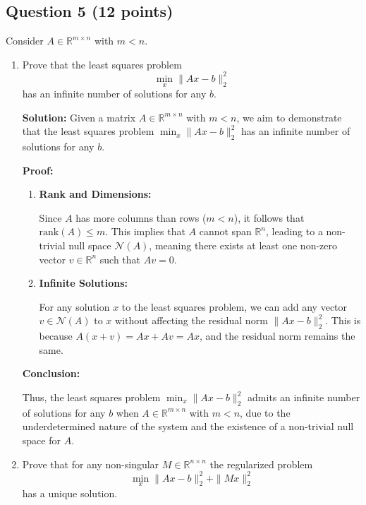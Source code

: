 \documentclass[11pt,onecolumn]{article}
\newcommand{\R}{\mathbb{R}}
\newcommand{\Rn}{\R^{n\times n}}
\begin{document}
\subsection*{Question 5 (12 points)}
Consider $A\in\R^{m\times n}$ with $m< n.$
\begin{enumerate}[label=(\alph*)]
    \item Prove that the least squares problem
          \[
              \min_x \|Ax - b\|_2^2
          \]
          has an infinite number of solutions for any $b.$

          \textbf{Solution:} Given a matrix $A \in \mathbb{R}^{m \times n}$ with $m < n$, we aim to demonstrate that the least squares problem $\min_x \|Ax - b\|_2^2$ has an infinite number of solutions for any $b$.

          \textbf{Proof:}

          \begin{enumerate}
              \item \textbf{Rank and Dimensions:}

                    Since $A$ has more columns than rows ($m < n$), it follows that $\text{rank}(A) \leq m$. This implies that $A$ cannot span $\mathbb{R}^n$, leading to a non-trivial null space $\mathcal{N}(A)$, meaning there exists at least one non-zero vector $v \in \mathbb{R}^n$ such that $Av = 0$.

              \item \textbf{Infinite Solutions:}

                    For any solution $x$ to the least squares problem, we can add any vector $v \in \mathcal{N}(A)$ to $x$ without affecting the residual norm $\|Ax - b\|_2^2$. This is because $A(x + v) = Ax + Av = Ax$, and the residual norm remains the same.
          \end{enumerate}

          \textbf{Conclusion:}

          Thus, the least squares problem $\min_x \|Ax - b\|_2^2$ admits an infinite number of solutions for any $b$ when $A \in \mathbb{R}^{m \times n}$ with $m < n$, due to the underdetermined nature of the system and the existence of a non-trivial null space for $A$.

    \item Prove that for any non-singular $M\in\Rn$ the regularized problem
          \begin{equation}
              \label{eqn:LS}
              \min_x \|Ax - b\|_2^2 + \|Mx\|_2^2
          \end{equation}
          has a unique solution.


\end{enumerate}
\end{document}
